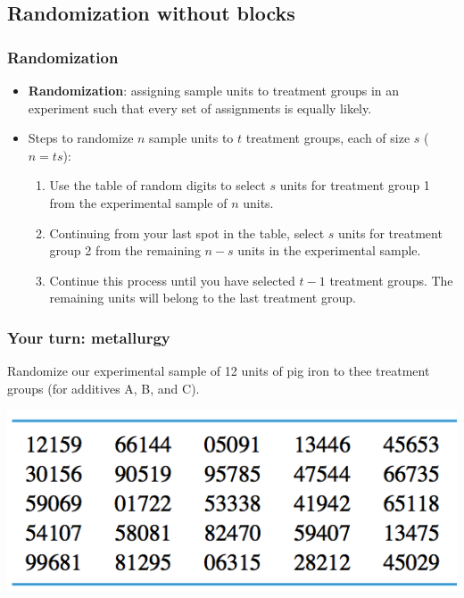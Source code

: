 \documentclass[handout]{beamer}
\numberwithin{equation}{section}
\begin{document}
\subsection{Randomization without blocks}


\begin{frame}
\frametitle{Randomization}

\begin{itemize}
\item {\bf Randomization}: assigning sample units to treatment groups in an experiment such that every set of assignments is equally likely.
\pause \item Steps to randomize $n$ sample units to $t$ treatment groups, each of size $s$ ($n = ts$):
\begin{enumerate}[1. ]
\pause \item Use the table of random digits to select $s$ units for treatment group 1 from the experimental sample of $n$ units.
\pause \item Continuing from your last spot in the table, select $s$ units for treatment group 2 from the remaining $n - s$ units in the experimental sample.
\pause \item Continue this process until you have selected $t - 1$ treatment groups. The remaining units will belong to the last treatment group.
\end{enumerate}
\end{itemize}
\end{frame}


\begin{frame}
\frametitle{Your turn: metallurgy}

Randomize our experimental sample of 12 units of pig iron to thee treatment groups (for additives A, B, and C).

\begin{center}
 \includegraphics{../../fig/rdigitsshort.png}
\end{center}

\end{frame}
\end{document}

